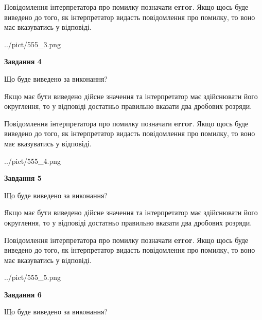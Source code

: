 \documentclass[12pt, ukrainian]{article}
\begin{document}
{\begin {Large}
Повідомлення інтерпретатора про помилку позначати \textbf{error}.
Якщо щось буде виведено до того, як інтерпретатор видасть повідомлення про помилку, 
то воно має вказуватись у відповіді. \par

\begin{center}
	{../pict/555_3.png}
\end{center}
\newpage

{\begin {center}\textbf{Завдання 4}\end {center}}\par
Що буде виведено за виконання? \par

Якщо має бути виведено дійсне значення та інтерпретатор має здійснювати його округлення, 
то у відповіді достатньо правильно вказати два дробових розряди.

Повідомлення інтерпретатора про помилку позначати \textbf{error}.
Якщо щось буде виведено до того, як інтерпретатор видасть повідомлення про помилку, 
то воно має вказуватись у відповіді. \par

\begin{center}
	{../pict/555_4.png}
\end{center}
\newpage

{\begin {center}\textbf{Завдання 5}\end {center}}\par
Що буде виведено за виконання? \par

Якщо має бути виведено дійсне значення та інтерпретатор має здійснювати його округлення, 
то у відповіді достатньо правильно вказати два дробових розряди.

Повідомлення інтерпретатора про помилку позначати \textbf{error}.
Якщо щось буде виведено до того, як інтерпретатор видасть повідомлення про помилку, 
то воно має вказуватись у відповіді. \par

\begin{center}
	{../pict/555_5.png}
\end{center}
\newpage

{\begin {center}\textbf{Завдання 6}\end {center}}\par
Що буде виведено за виконання? \par


\end{Large}}
\end{document}
